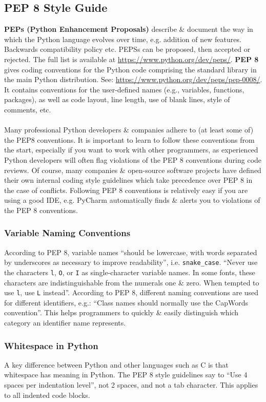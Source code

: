 \documentclass[a4paper,11pt]{article}
\begin{document}
\subsection{PEP 8 Style Guide}
\textbf{PEPs (Python Enhancement Proposals)} describe \& document the way in which the Python language evolves over time, e.g. addition of new features.
Backwards compatibility policy etc. PEPSs can be proposed, then accepted or rejected.
The full list is available at \url{https://www.python.org/dev/peps/}.
\textbf{PEP 8} gives coding conventions for the Python code comprising the standard library in the main Python 
distribution. See: \url{https://www.python.org/dev/peps/pep-0008/}.
It contains conventions for the user-defined names (e.g., variables, functions, packages), as well as code layout,
line length, use of blank lines, style of comments, etc.
\\\\
Many professional Python developers \& companies adhere to (at least some of) the PEP8 conventions.
It is important to learn to follow these conventions from the start, especially if you want to work with other 
programmers, as experienced Python developers will often flag violations of the PEP 8 conventions during code
reviews.
Of course, many companies \& open-source software projects have defined their own internal coding style guidelines
which take precedence over PEP 8 in the case of conflicts.
Following PEP 8 conventions is relatively easy if you are using a good IDE, e.g. PyCharm automatically finds \& 
alerts you to violations of the PEP 8 conventions.

\subsubsection{Variable Naming Conventions}
According to PEP 8, variable names ``should be lowercase, with words separated by underscores as necessary to 
improve readability'', i.e. \texttt{snake_case}.
``Never use the characters \verb|l|, \verb|O|, or \verb|I| as single-character variable names.
In some fonts, these characters are indistinguishable from the numerals one \& zero. 
When tempted to use \verb|l|, use \verb|L| instead''.
According to PEP 8, different naming conventions are used for different identifiers, e.g.:
``Class names should normally use the CapWords convention''.
This helps programmers to quickly \& easily distinguish which category an identifier name represents.

\subsubsection{Whitespace in Python}
A key difference between Python and other languages such as C is that whitespace has meaning in Python.
The PEP 8 style guidelines say to ``Use 4 spaces per indentation level'', not 2 spaces, and not a tab character.
This applies to all indented code blocks.
\end{document}
